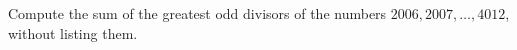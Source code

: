Compute the sum of the greatest odd divisors of the numbers $2006,2007,\dots,4012$, without listing them.
